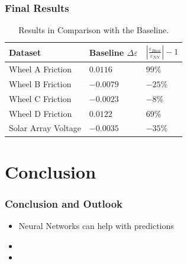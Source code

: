 \begin{frame}
	\frametitle{Final Results}
	
\scriptsize
\begin{table}[htb]
\centering
\caption{Results in Comparison with the Baseline.}
\begin{tabular}{b{}b{}b{}}
\toprule
Dataset				& Baseline $\Delta\varepsilon$	& $\left| \frac{\varepsilon_{Base}}{\varepsilon_{NN}} \right| - 1$	\\ \midrule
Wheel A Friction		& $\num{0.0116}$	& 	$\num{99}$\%	\\
Wheel B Friction		& $\num{-0.0079}$	& $\num{-25}$\%	\\
Wheel C Friction		& $\num{-0.0023}$	& $\num{-8}$\%	\\
Wheel D Friction		& $\num{0.0122}$		& $\num{69}$\%	\\ \midrule
Solar Array Voltage	& $\num{-0.0035}$	& $\num{-35}$\%	\\ 
\bottomrule
\end{tabular}
\end{table}	
		
\end{frame}

\section*{Conclusion}

\begin{frame}
	\frametitle{Conclusion and Outlook}
	
\begin{itemize}
\item Neural Networks can help with predictions
\item []
\item []
\end{itemize}
\end{frame}
